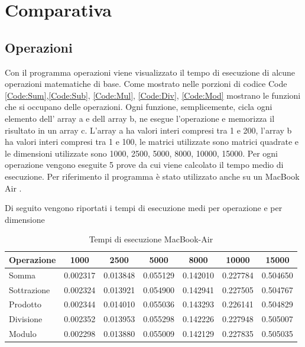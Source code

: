\documentclass[12pt,a4paper]{report}
\begin{document}
\chapter{Comparativa}
\section{Operazioni}
	Con il programma operazioni viene visualizzato il tempo di esecuzione di alcune operazioni matematiche di base. Come mostrato nelle porzioni di codice Code \ref{Code:Sum},\ref{Code:Sub}, \ref{Code:Mul}, \ref{Code:Div}, \ref{Code:Mod} mostrano le funzioni che si occupano delle operazioni. Ogni funzione, semplicemente, cicla ogni elemento dell' array a e dell array b, ne esegue l'operazione e memorizza il risultato in un array c. L'array a ha valori interi compresi tra 1 e 200, l'array b ha valori interi compresi tra 1 e 100,  le matrici utilizzate sono matrici quadrate e le dimensioni utilizzate sono 1000, 2500, 5000, 8000, 10000, 15000. Per ogni operazione vengono eseguite 5 prove da cui viene calcolato il tempo medio di esecuzione. 
	Per riferimento il programma è stato utilizzato anche su un MacBook Air .
	
	
	
	
	
	
	
	Di seguito vengono riportati i tempi di esecuzione medi per operazione e per dimensione
	\begin{table}[h!]
	
	\centering
	\begin{tabular}{| l | c | c | c | c | c | c |}
		\hline
		Operazione & 1000 & 2500 & 5000 & 8000 & 10000 & 15000 \\ \hline
		Somma & 0.002317 & 0.013848 & 0.055129 & 0.142010 & 0.227784 & 0.504650\\ \hline
		Sottrazione & 0.002324 & 0.013921 & 0.054900 & 0.142941 & 0.227505 & 0.504767\\ \hline
		Prodotto & 0.002344 & 0.014010 & 0.055036 & 0.143293 & 0.226141 & 0.504829\\ \hline
		Divisione & 0.002352 & 0.013953 & 0.055298 & 0.142226 & 0.227948 & 0.505007\\ \hline
		Modulo & 0.002298 & 0.013880 & 0.055009 & 0.142129 & 0.227835 & 0.505035\\ \hline

	\end{tabular}
	
	\caption{Tempi di esecuzione MacBook-Air}
	\end{table}
	
\end{document}
